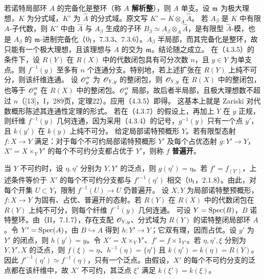 若诺特局部环 $A$ 的完备化是整环（称 $A$ \textbf{解析整}），则 $A$ 单支。设 $\mathfrak m$ 为极大理想，$K$ 为分式域，$K'$ 为 $\widehat A$ 的分式域。原文写 $K'=K\otimes_A\widehat A$。
若 $A_\beta$ 是 $K$ 中有限 $A$-子代数，则 $K'$ 中由 $\widehat A$ 与 $A_\beta$ 生成的子环 $B_\beta\simeq A_\beta\otimes_A\widehat A$，是有限型 $\widehat A$-模，也是 $A_\beta$ 的 $\mathfrak m$-进制完备化（$0_{\mathrm I}$，7.3.3、7.3.6）。$A_\beta$ 半局部，而其完备化是整环，故只能有一个极大理想，且该理想与 $A$ 的交为 $\mathfrak m$。结论随之成立。
在（4.3.5）的条件下，设 $R(Y)$ 在 $R(X)$ 中的代数闭包具有可分次数 $n$，且 $y\in Y$ 为单支点。则 $f^{-1}(y)$ 至多有 $n$ 个连通分支。特别地，若上述扩张在 $R(Y)$ 上纯不可分，则该纤维连通。
\eproof
设 $\mathscr O''_y$ 为 $\mathscr O_{Y,y}$ 的整闭包，则 $\mathscr O_{Y,y}$ 在 $R(X)$ 中的整闭包，也等于 $\mathscr O''_y$ 在 $R(X)$ 中的整闭包。$\mathscr O''_y$ 局部，故后者半局部，且极大理想数不超过 $n$（[13]，I，289页，定理22）。应用（4.3.5）即得。\finishproof
这基本上就是 Zariski 对代数概形陈述其连通性定理的形式。
若在（4.3.7）的假设上，再加上 $Y$ 在 $y$ 正规，则纤维 $f^{-1}(y)$ 几何连通，因为采用（4.3.4）的记号，$g^{-1}(y)$ 只有一个点 $y'$，且 $k(y')$ 在 $k(y)$ 上纯不可分。
给定局部诺特预概形 $Y$。若有限型态射 $f:X\to Y$ 满足：对于每个不可约局部诺特预概形 $Y'$ 及每个占优态射 $g:Y'\to Y$，$X'=X\times_YY'$ 的每个不可约分支都占优于 $Y'$，则称 $f$ \textbf{普遍开}。

当 $Y$ 不可约时，设 $\eta,\eta'$ 分别为 $Y,Y'$ 的泛点，则 $g(\eta')=\eta$。若 $f'=f_{(Y')}$，上述条件等价于 $X'$ 的每个不可约分支都与 $f'^{-1}(\eta')$ 相交（$0_{\mathrm I}$，2.1.8）。由此，对每个开集 $U\subset Y$，限制 $f^{-1}(U)\to U$ 仍普遍开。
设 $X,Y$ 为局部诺特整预概形，$f:X\to Y$ 为固有、占优、普遍开的态射。若 $R(Y)$ 在 $R(X)$ 中的代数闭包在 $R(Y)$ 上纯不可分，则每个纤维 $f^{-1}(y)$ 几何连通。
\eproof
可设 $Y=\operatorname{Spec}(B)$，$B$ 诺特整环。由（II，7.1.7），存在支配 $\mathscr O_{Y,y}$、分式域为 $R(Y)$ 的诺特整闭局部环 $A$。令 $Y'=\operatorname{Spec}(A)$，由 $B\hookrightarrow A$ 得到 $h:Y'\to Y$；它双有理，因而占优。设 $y'$ 为 $Y'$ 的闭点，则 $h(y')=y$。令 $X'=X\times_YY'$、$f'=f\times1_{Y'}$。若 $\eta,\eta',\xi$ 分别为 $Y,Y',X$ 的泛点，则 $f(\xi)=\eta$、$h^{-1}(\eta)=\{\eta'\}$ 且 $k(\eta')=k(\eta)=R(Y)$。因此 $f'^{-1}(\eta')\simeq f^{-1}(\eta)$，只有一个泛点。由假设，$X'$ 的每个不可约分支的泛点都在该纤维中，故 $X'$ 不可约，其泛点 $\xi'$ 满足 $k(\xi')=k(\xi)$。


